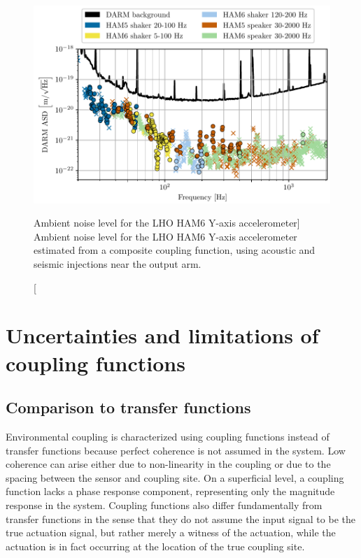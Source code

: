 \begin{figure}[h!]
	\centering
	\includegraphics{figures/noise-methods/cf-composite.pdf}
	\caption
	[Ambient noise level for the LHO HAM6 Y-axis accelerometer]
	{
		Ambient noise level for the LHO HAM6 Y-axis accelerometer estimated from a composite coupling function, using acoustic and seismic injections near the output arm.
		}
	\label{fig:cf-composite}
\end{figure}

\section{Uncertainties and limitations of coupling functions}\label{sec:uncertainties}

\subsection{Comparison to transfer functions}

Environmental coupling is characterized using coupling functions instead of transfer functions because perfect coherence is not assumed in the system.
Low coherence can arise either due to non-linearity in the coupling or due to the spacing between the sensor and coupling site.
On a superficial level, a coupling function lacks a phase response component, representing only the magnitude response in the system.
Coupling functions also differ fundamentally from transfer functions in the sense that they do not assume the input signal to be the true actuation signal, but rather merely a witness of the actuation, while the actuation is in fact occurring at the location of the true coupling site.

